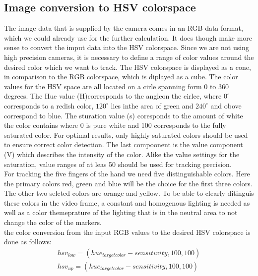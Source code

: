 \subsection{Image conversion to HSV colorspace}
The image data that is supplied by the camera comes in an RGB data format, which we could already use for the further calculation. It does though make more sense to convert the imput data into the HSV colorspace. Since we are not using high precision cameras, it is necessary to define a range of color values around the desired color which we want to track. The HSV colorspace is displayed as a cone, in comparison to the RGB colorspace, which is diplayed as a cube. The color values for the HSV space are all located on a cirle spanning form 0 to 360 degrees. The Hue value (H)corresponds to the angleon the cirlce, where $0^\circ$ corresponds to a redish color, $120^\circ$ lies inthe area of green and $240^\circ$ and obove correspond to blue. The sturation value (s) coresponds to the amount of white the color contains  where 0 is pure white and 100 corresponds to the fully saturated color. For optimal results, only highly saturated colors should be used to ensure correct color detection. The last compoonent is the value component (V) which describes the intensity of the color. Alike the value settings for the saturation, value ranges of at leas 50 should be used for tracking precision.
\\
For tracking the five fingers of the hand we need five distinguishable colors. Here the primary colors red, green and blue will be the choice for the first three colors. The other two selcted colors  are orange and yellow. To be able to clearly ditinguis these colors in the video frame, a constant and homogenous lighting is needed as well as a color themeprature of the lighting that is in the neutral area to not change the color of the markers.
\\the color conversion from the input RGB values to the desired HSV colorspace is done as follows:
\begin{equation}
\begin{split}
hsv_{low}=(hue_{targetcolor}-sensitivity,100,100)\\
hsv_{up}=(hue_{targetcolor}-sensitivity,100,100)\\
\end{split}
\end{equation}
